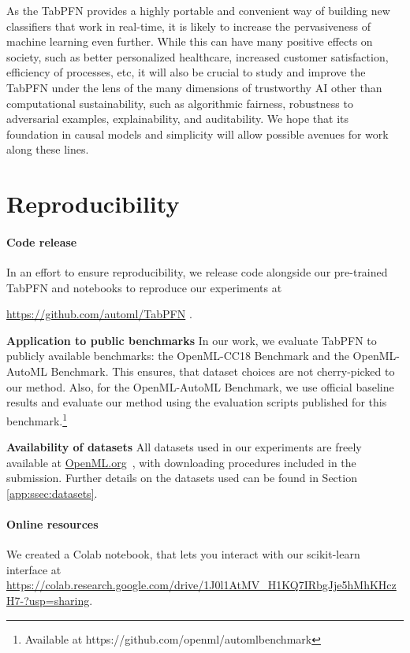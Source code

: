 As the TabPFN provides a highly portable and convenient way of building new classifiers that work in real-time, it is likely to increase the pervasiveness of machine learning even further. While this can have many positive effects on society, such as better personalized healthcare, increased customer satisfaction, efficiency of processes, etc, it will also be crucial to study and improve the TabPFN under the lens of the many dimensions of trustworthy AI other than computational sustainability, such as algorithmic fairness, robustness to adversarial examples, explainability, and auditability. We hope that its foundation in causal models and simplicity will allow possible avenues for work along these lines.

\section{Reproducibility}\label{sec:reproducibility}

\paragraph{Code release} In an effort to ensure reproducibility, we release code alongside our pre-trained TabPFN and notebooks to reproduce our experiments at 

\url{https://github.com/automl/TabPFN}
.

\textbf{Application to public benchmarks} In our work, we evaluate TabPFN to publicly available benchmarks: the OpenML-CC18 Benchmark and the OpenML-AutoML Benchmark. This ensures, that dataset choices are not cherry-picked to our method. Also, for the OpenML-AutoML Benchmark, we use official baseline results and evaluate our method using the evaluation scripts published for this benchmark.\footnote{Available at https://github.com/openml/automlbenchmark}

\textbf{Availability of datasets} All datasets used in our experiments are freely available at \url{OpenML.org}~\citep{vanschoren-sigkdd14a}, with downloading procedures included in the submission. Further details on the datasets used can be found in Section \ref{app:ssec:datasets}.

\paragraph{Online resources}We created a Colab notebook, that lets you interact with our scikit-learn interface at \url{https://colab.research.google.com/drive/1J0l1AtMV_H1KQ7IRbgJje5hMhKHczH7-?usp=sharing}.

